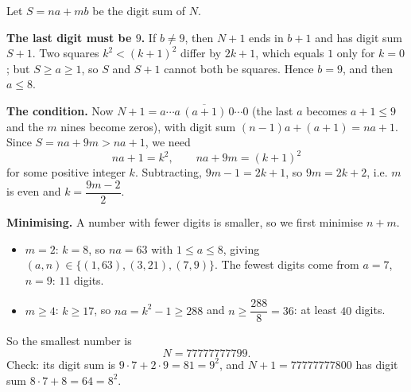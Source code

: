 Let $S=na+mb$ be the digit sum of $N$.

\textbf{The last digit must be $9$.} If $b\ne9$, then $N+1$ ends in $b+1$ and has digit sum $S+1$. Two squares $k^2<(k+1)^2$ differ by $2k+1$, which equals $1$ only for $k=0$; but $S\ge a\ge1$, so $S$ and $S+1$ cannot both be squares. Hence $b=9$, and then $a\le8$.

\textbf{The condition.} Now $N+1=\overline{a\cdots a\,(a+1)\,0\cdots0}$ (the last $a$ becomes $a+1\le9$ and the $m$ nines become zeros), with digit sum $(n-1)a+(a+1)=na+1$. Since $S=na+9m>na+1$, we need
\[na+1=k^2,\qquad na+9m=(k+1)^2\]
for some positive integer $k$. Subtracting, $9m-1=2k+1$, so $9m=2k+2$, i.e. $m$ is even and $k=\dfrac{9m-2}{2}$.

\textbf{Minimising.} A number with fewer digits is smaller, so we first minimise $n+m$.
\begin{itemize}
\item $m=2$: $k=8$, so $na=63$ with $1\le a\le8$, giving $(a,n)\in\{(1,63),(3,21),(7,9)\}$. The fewest digits come from $a=7$, $n=9$: $11$ digits.
\item $m\ge4$: $k\ge17$, so $na=k^2-1\ge288$ and $n\ge\dfrac{288}{8}=36$: at least $40$ digits.
\end{itemize}
So the smallest number is
\[N=\boxed{77777777799}.\]
Check: its digit sum is $9\cdot7+2\cdot9=81=9^2$, and $N+1=77777777800$ has digit sum $8\cdot7+8=64=8^2$.
